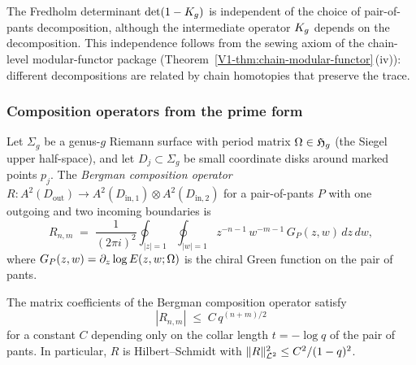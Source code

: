 \begin{remark}%
%
The Fredholm determinant $\det(1 - K_g)$ is independent
of the choice of pair-of-pants decomposition, although the
intermediate operator $K_g$ depends on the decomposition.
This independence follows from the sewing axiom of the
chain-level modular-functor package
(Theorem~\ref*{V1-thm:chain-modular-functor}\,(iv)):
different decompositions are related by chain homotopies
that preserve the trace.
\end{remark}

\subsubsection{Composition operators from the prime form}

\begin{definition}%
\label{def:thqg-X-bergman-composition}%
%
Let $\Sigma_g$ be a genus-$g$ Riemann surface with period
matrix $\Omega \in \mathfrak{H}_g$ (the Siegel upper half-space),
and let $D_j \subset \Sigma_g$ be small coordinate disks around
marked points $p_j$. The \emph{Bergman composition operator}
$R \colon A^2(D_{\mathrm{out}}) \to
A^2(D_{\mathrm{in},1}) \otimes A^2(D_{\mathrm{in},2})$
for a pair-of-pants $P$ with one outgoing and two incoming
boundaries is
\begin{equation}%
R_{n,m}
\;=\;
\frac{1}{(2\pi i)^2}
\oint_{|z|=1} \oint_{|w|=1}
z^{-n-1}\,w^{-m-1}\,
G_P(z,w)\,dz\,dw,
\end{equation}
where $G_P(z,w) = \partial_z \log E(z,w;\Omega)$ is the
chiral Green function on the pair of pants.
\end{definition}

\begin{lemma}%
\label{lem:thqg-X-composition-decay}%
%
The matrix coefficients of the Bergman composition operator satisfy
\begin{equation}%
|R_{n,m}|
\;\leq\;
C\,q^{(n+m)/2}
\end{equation}
for a constant $C$ depending only on the collar length
$t = -\log q$ of the pair of pants. In particular,
$R$ is Hilbert--Schmidt with
$\|R\|_{\mathcal{L}^2}^2 \leq C^2/(1-q)^2$.
\end{lemma}

